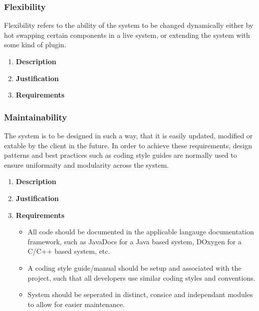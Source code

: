 \documentclass[a4paper,10pt]{article}
\begin{document}
\subsubsection{Flexibility}
Flexibility refers to the ability of the system to be changed dynamically either by hot swapping certain components in a live system, or extending the system with some kind of plugin. 
\begin{enumerate}
\item \textbf{Description}
\item \textbf{Justification}
\item \textbf{Requirements}
\end{enumerate}

\subsubsection{Maintainability}
The system is to be designed in such a way, that it is easily updated, modified or extable by the client in the future. In order to achieve these requirements, design patterns and best practices such as coding style guides are normally used to ensure uniformaity and modularity across the system.
\begin{enumerate}
\item \textbf{Description}
\item \textbf{Justification}
\item \textbf{Requirements}
	\begin{itemize}
	\item All code should be documented in the applicable langauge documentation framework, such as JavaDocs for a Java based system, DOxygen for a C/C++ based system, etc.
	\item A coding style guide/manual should be setup and associated with the project, such that all developers use similar coding styles and conventions.
	\item System should be seperated in distinct, consice and independant modules to allow for easier maintenance.
	\end{itemize}
\end{enumerate}
\end{document}
